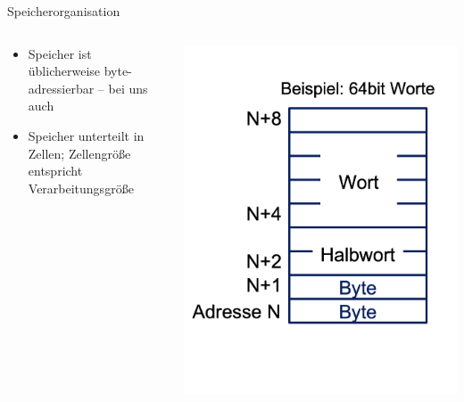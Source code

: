 \documentclass[
  german,            %
  aspectratio=169,    %
]{tumbeamer}
\begin{document}
\begin{frame}[c]{Speicherorganisation}{}
  \begin{columns}[c]
    \begin{column}{0.5\textwidth}
      \begin{itemize}
          \item Speicher ist üblicherweise byte-adressierbar -- bei uns auch
          \item Speicher unterteilt in Zellen; Zellengröße entspricht Verarbeitungsgröße
      \end{itemize}
    \end{column}
    \begin{column}{0.5\textwidth}
      \includegraphics[width=0.70\linewidth]{speicher.png}
    \end{column}
  \end{columns}
\end{frame}
\end{document}
